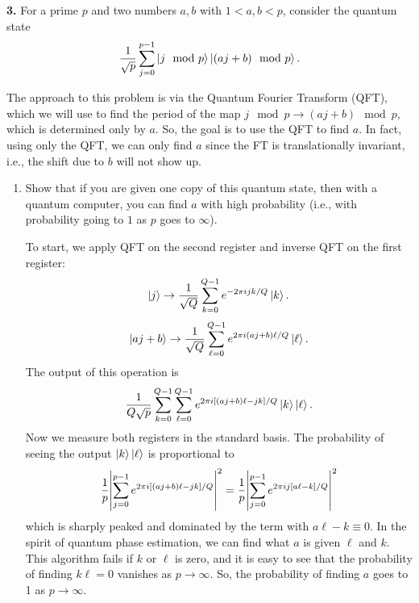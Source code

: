 \documentclass{article}
\theoremstyle{definition}
\newcommand{\f}[2]{\frac{#1}{#2}}
\begin{document}
\noindent \textbf{3. } For a prime $p$ and two numbers $a,b$ with $1 < a, b < p$, consider the quantum state
\begin{align*}
\f{1}{\sqrt{p}} \sum^{p-1}_{j=0} \ket{ j \mod p } \ket{(aj + b) \mod p}.
\end{align*}

\noindent The approach to this problem is via the Quantum Fourier Transform (QFT), which we will use to find the period of the map $j \mod p \to (aj + b) \mod p$, which is determined only by $a$. So, the goal is to use the QFT to find $a$. In fact, using only the QFT, we can only find $a$ since the FT is translationally invariant, i.e., the shift due to $b$ will not show up.   

\begin{enumerate}[label=(\alph*)]

\item Show that if you are given one copy of this quantum state, then with a quantum computer, you can find $a$ with high probability (i.e., with probability going to $1$ as $p$ goes to $\infty$). 

\noindent To start, we apply QFT on the second register and inverse QFT on the first register:
\begin{align*}
	\ket{j} \to  \f{1}{\sqrt{Q}} \sum_{k=0}^{Q-1} e^{-2\pi i jk/Q} \ket{k}.
\end{align*}
\begin{align*}
	\ket{aj + b} \to  \f{1}{\sqrt{Q}} \sum_{\ell=0}^{Q-1} e^{2\pi i (aj+b) \ell / Q} \ket{\ell}. 
\end{align*}
The output of this operation is 
\begin{align*}
	\f{1}{Q\sqrt{p}}   \sum_{k=0}^{Q-1} \sum_{\ell=0}^{Q-1} e^{2\pi i [ (aj+b)\ell - jk]  /Q } \ket{k} \ket{\ell}.
\end{align*}
Now we measure both registers in the standard basis. The probability of seeing the output $\ket{k}\ket{\ell}$ is proportional to
\begin{align*}
	\f{1}{p}\abs{\sum_{j=0}^{p-1} e^{2\pi i [ (aj+b)\ell - jk]  /Q }}^2 =  \f{1}{p}	\abs{\sum_{j=0}^{p-1} e^{2\pi i j [ a\ell - k]  /Q }}^2
\end{align*}
which is sharply peaked and dominated by the term with $a\ell - k \equiv 0$.  In the spirit of quantum phase estimation, we can find what $a$ is given $\ell$ and $k$. This algorithm fails if $k$ or $\ell$ is zero, and it is easy to see that the probability of finding $k\ell = 0$ vanishes as $p \to \infty$. So, the probability of finding $a$ goes to 1 as $p\to \infty$. 


\end{enumerate}
\end{document}

